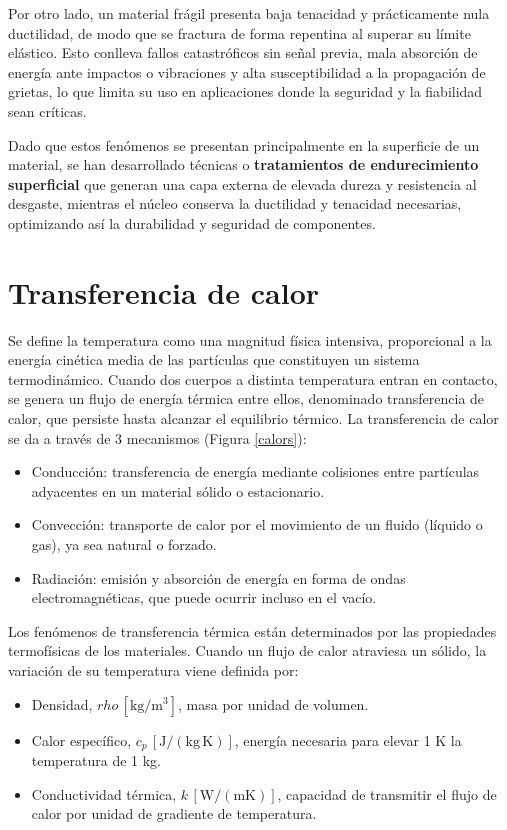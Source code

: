 Por otro lado, un material frágil presenta baja tenacidad y prácticamente nula ductilidad, de modo que se fractura de forma repentina al superar su límite elástico. Esto conlleva fallos catastróficos sin señal previa, mala absorción de energía ante impactos o vibraciones y alta susceptibilidad a la propagación de grietas, lo que limita su uso en aplicaciones donde la seguridad y la fiabilidad sean críticas.

Dado que estos fenómenos se presentan principalmente en la superficie de un material, se han desarrollado técnicas o \textbf{tratamientos de endurecimiento superficial} que generan una capa externa de elevada dureza y resistencia al desgaste, mientras el núcleo conserva la ductilidad y tenacidad necesarias, optimizando así la durabilidad y seguridad de componentes.

\section{Transferencia de calor}

Se define la temperatura como una magnitud física intensiva, proporcional a la energía cinética media de las partículas que constituyen un sistema termodinámico. Cuando dos cuerpos a distinta temperatura entran en contacto, se genera un flujo de energía térmica entre ellos, denominado transferencia de calor, que persiste hasta alcanzar el equilibrio térmico. La transferencia de calor se da a través de 3 mecanismos (Figura \ref{calors}):

\begin{itemize}
  \item Conducción: transferencia de energía mediante colisiones entre partículas adyacentes en un material sólido o estacionario.
  \item Convección: transporte de calor por el movimiento de un fluido (líquido o gas), ya sea natural o forzado.
  \item Radiación: emisión y absorción de energía en forma de ondas electromagnéticas, que puede ocurrir incluso en el vacío.
\end{itemize}

Los fenómenos de transferencia térmica están determinados por las propiedades termofísicas de los materiales. Cuando un flujo de calor atraviesa un sólido, la variación de su temperatura viene definida por:

\begin{itemize}
  \item Densidad, $rho\,\mathrm{[kg/m^{3}]}$, masa por unidad de volumen.
  \item Calor específico, $c_p\,\mathrm{[J/(kg\,K)]}$, energía necesaria para elevar 1 K la temperatura de 1 kg.
  \item Conductividad térmica, $k\,\mathrm{[W/(mK)]}$, capacidad de transmitir el flujo de calor por unidad de gradiente de temperatura.
\end{itemize}


